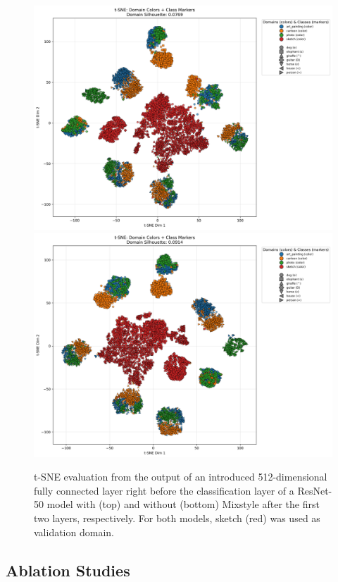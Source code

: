 \begin{figure}
    \centering
    \includegraphics[width=.95\textwidth]{images/tsne_pacs_resnet50_fc512_ms12_a0d1_.png}
    \includegraphics[width=.95\textwidth]{images/tsne_pacs_resnet50_fc512_.png}
    \caption{t-SNE evaluation from the output of an introduced 512-dimensional fully connected layer right before the classification layer of a ResNet-50 model with (top) and without (bottom) Mixstyle after the first two layers, respectively. For both models, sketch (red) was used as validation domain.}
    \label{fig:tSNE}
\end{figure}

\subsection{Ablation Studies}

